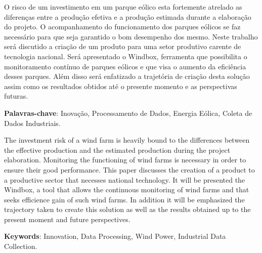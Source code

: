 %
%


O risco de um investimento em um parque eólico esta fortemente atrelado as diferenças entre a produção efetiva e a produção estimada durante a elaboração do projeto. O acompanhamento do funcionamento dos parques eólicos se faz necessário para que seja garantido o bom desempenho dos mesmo. Neste trabalho será discutido a criação de um produto para uma setor produtivo carente de tecnologia nacional. Será apresentado o Windbox, ferramenta que possibilita o monitoramento contínuo de parques eólicos e que visa o aumento da eficiência desses parques. Além disso será enfatizado a trajetória de criação desta solução assim como os resultados obtidos até o presente momento e as perspectivas futuras.

\vspace{1.5ex}

{\bf Palavras-chave}: Inovação, Processamento de Dados, Energia Eólica,
Coleta de Dados Industriais.

%
%

The investment risk of a wind farm is heavily bound to the differences between the effective production and the estimated production during the project elaboration.
Monitoring the functioning of wind farms is necessary in order to ensure their good performance. This paper discusses the creation of a product to a productive sector that necesses national technology. It will be presented the Windbox, a tool that allows the continuous monitoring of wind farms and that seeks efficience gain of such wind farms. In addition it will be emphasized the trajectory taken to create this solution as well as the results obtained up to the present moment and future perspectives.

\vspace{1.5ex}

{\bf Keywords}: Innovation, Data Processing, Wind Power,
Industrial Data Collection.
